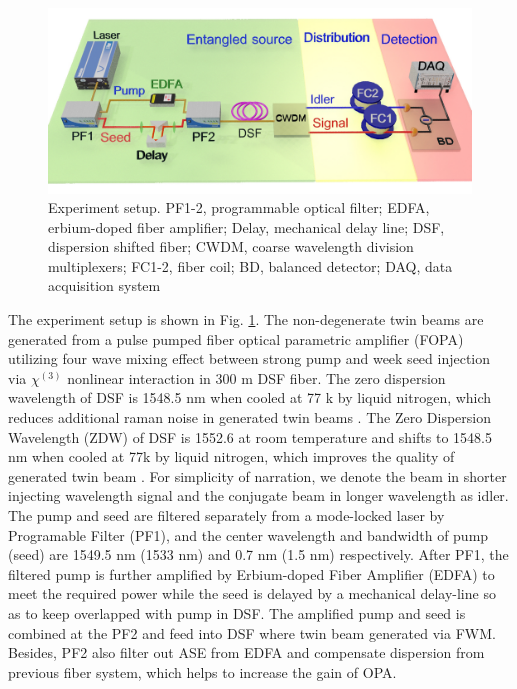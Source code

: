 \documentclass[9pt,twocolumn,twoside]{osajnl}
\begin{document}
\begin{figure}[htbp]
\centering
\includegraphics[width=\linewidth]{fig1_3d_2.jpg}
\caption{Experiment setup.
PF1-2, programmable optical filter;
EDFA, erbium-doped fiber amplifier;
Delay, mechanical delay line;
DSF, dispersion shifted fiber;
CWDM, coarse wavelength division multiplexers;
FC1-2, fiber coil;
BD, balanced detector;
DAQ, data acquisition system}
\label{fig_setup}

\end{figure}
The experiment setup is shown in Fig. \ref{fig_setup}.
The non-degenerate twin beams are generated from a pulse pumped fiber optical parametric amplifier (FOPA) utilizing four wave mixing effect between strong pump and week seed injection via \(\chi^{(3)} \) nonlinear interaction in 300 m DSF fiber.
The zero dispersion wavelength of DSF is 1548.5 nm when cooled at 77 k by liquid nitrogen, which reduces additional raman noise in generated twin beams \cite{guo12}.
The Zero Dispersion Wavelength (ZDW) of DSF is 1552.6 at room temperature and shifts to 1548.5 nm when cooled at 77k by liquid nitrogen, which improves the quality of generated twin beam \cite{guo12}.
For simplicity of narration, we denote the beam in shorter injecting wavelength signal and the conjugate beam in longer wavelength as idler.
The pump and seed are filtered separately from a mode-locked laser by Programable Filter (PF1), and the center wavelength and bandwidth of pump (seed) are 1549.5 nm (1533 nm) and 0.7 nm (1.5 nm) respectively.
After PF1, the filtered pump is further amplified by Erbium-doped Fiber Amplifier (EDFA) to meet the required power while the seed is delayed by a mechanical delay-line so as to keep overlapped with pump in DSF.
The amplified pump and seed is combined at the PF2 and feed into DSF where twin beam generated via FWM.
Besides, PF2 also filter out ASE from EDFA and compensate dispersion from previous fiber system, which helps to increase the gain of OPA.
\end{document}
